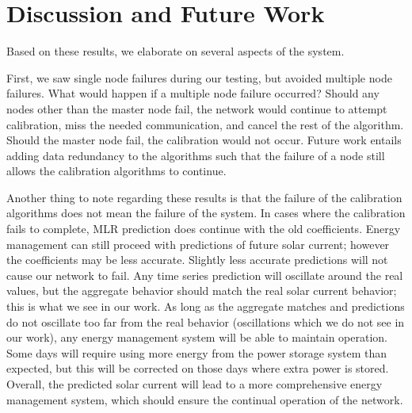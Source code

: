 \documentclass[prodmode,acmtosn]{acmsmall}
\begin{document}
\section{Discussion and Future Work}\label{sec:solar-discuss}
Based on these results, we elaborate on several aspects of the system.

First, we saw single node failures during our testing, but avoided multiple node failures.
What would happen if a multiple node failure occurred?
Should any nodes other than the master node fail, the network would continue to attempt calibration, miss the needed communication, and cancel the rest of the algorithm.
Should the master node fail, the calibration would not occur.
Future work entails adding data redundancy to the algorithms such that the failure of a node still allows the calibration algorithms to continue.

Another thing to note regarding these results is that the failure of the calibration algorithms does not mean the failure of the system.
In cases where the calibration fails to complete, MLR prediction does continue with the old coefficients.
Energy management can still proceed with predictions of future solar current; however the coefficients may be less accurate.
Slightly less accurate predictions will not cause our network to fail.
Any time series prediction will oscillate around the real values, but the aggregate behavior should match the real solar current behavior; this is what we see in our work.
As long as the aggregate matches and predictions do not oscillate too far from the real behavior (oscillations which we do not see in our work), any energy management system will be able to maintain operation.
Some days will require using more energy from the power storage system than expected, but this will be corrected on those days where extra power is stored.
Overall, the predicted solar current will lead to a more comprehensive energy management system, which should ensure the continual operation of the network.
\end{document}
